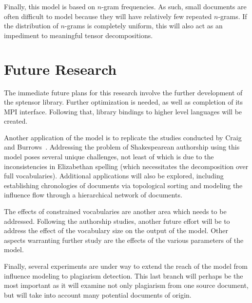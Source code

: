 \documentclass[../ut-dissertation.tex]{subfiles}
\begin{document}
Finally, this model is based on $n$-gram
frequencies.  As such, small documents are often difficult to model
because they will have relatively few repeated $n$-grams.  If the
distribution of $n$-grams is completely  uniform, this will also act
as an impediment to meaningful tensor decompositions.

\section{Future Research}
The immediate future plans for this research involve the further
development of the sptensor library.  Further optimization is needed,
as well as completion of its MPI interface.  Following that, library
bindings to higher level languages will be created.

Another application of the model is to replicate the studies conducted
by Craig and Burrows~\cite{burrows2017, craig2009}.  Addressing the
problem of Shakespearean authorship using this model poses several
unique challenges, not least of which is due to the inconsistencies in
Elizabethan spelling (which necessitates the decomposition over full
vocabularies).  Additional applications will also be explored,
including establishing chronologies of documents via topological
sorting and modeling the influence flow through a hierarchical network
of documents.

The effects of constrained vocabularies are another area which needs
to be addressed.  Following the authorship studies, another future
effort will be to address the effect of the vocabulary size on the
output of the model.  Other aspects warranting further study are the
effects of the various parameters of the model.

Finally, several experiments are under way to extend the reach of the
model from influence modeling to plagiarism detection.  This last
branch will perhaps be the most important as it will examine not only
plagiarism from one source document, but will take into account many
potential documents of origin.
\end{document}
